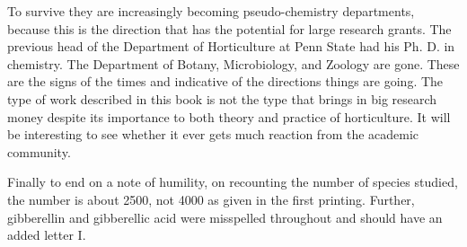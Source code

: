 To survive they are increasingly becoming pseudo-chemistry departments, because
this is the direction that has the potential for large research grants. The
previous head of the Department of Horticulture at Penn State had his Ph. D. in
chemistry. The Department of Botany, Microbiology, and Zoology are gone. These
are the signs of the times and indicative of the directions things are going.
The type of work described in this book is not the type that brings in big
research money despite its importance to both theory and practice of
horticulture. It will be interesting to see whether it ever gets much reaction
from the academic community.

Finally to end on a note of humility, on recounting the number of species
studied, the number is about 2500, not 4000 as given in the first printing. Further,
gibberellin and gibberellic acid were misspelled throughout and should have an added
letter I.
